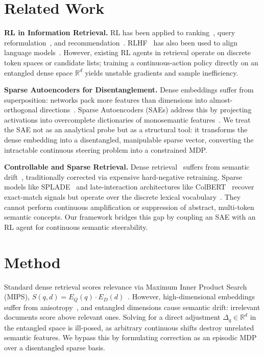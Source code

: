 \documentclass[sigconf]{acmart}
\begin{document}
\section{Related Work}

\textbf{RL in Information Retrieval.}
RL has been applied to ranking~\cite{hofmann2013}, query reformulation~\cite{nogueira2017, buck2018}, and recommendation~\cite{afsar2022}. RLHF~\cite{christiano2017} has also been used to align language models~\cite{ouyang2022, stiennon2020}. However, existing RL agents in retrieval operate on discrete token spaces or candidate lists; training a continuous-action policy directly on an entangled dense space $\mathbb{R}^d$ yields unstable gradients and sample inefficiency.

\textbf{Sparse Autoencoders for Disentanglement.}
Dense embeddings suffer from superposition: networks pack more features than dimensions into almost-orthogonal directions~\cite{elhage2022}. Sparse Autoencoders (SAEs) address this by projecting activations into overcomplete dictionaries of monosemantic features~\cite{cunningham2024, bricken2023, templeton2024}. We treat the SAE not as an analytical probe but as a structural tool: it transforms the dense embedding into a disentangled, manipulable sparse vector, converting the intractable continuous steering problem into a constrained MDP.

\textbf{Controllable and Sparse Retrieval.}
Dense retrieval~\cite{karpukhin2020, izacard2022} suffers from semantic drift~\cite{zhan2021}, traditionally corrected via expensive hard-negative retraining. Sparse models like SPLADE~\cite{formal2021splade} and late-interaction architectures like ColBERT~\cite{khattab2020} recover exact-match signals but operate over the discrete lexical vocabulary~\cite{robertson1994}. They cannot perform continuous amplification or suppression of abstract, multi-token semantic concepts. Our framework bridges this gap by coupling an SAE with an RL agent for continuous semantic steerability.

\section{Method}

Standard dense retrieval scores relevance via Maximum Inner Product Search (MIPS), $S(q,d) = E_Q(q) \cdot E_D(d)$~\cite{johnson2019}. However, high-dimensional embeddings suffer from anisotropy~\cite{ethayarajh2019}, and entangled dimensions cause semantic drift: irrelevant documents score above relevant ones. Solving for a direct adjustment $\Delta_q \in \mathbb{R}^d$ in the entangled space is ill-posed, as arbitrary continuous shifts destroy unrelated semantic features. We bypass this by formulating correction as an episodic MDP~\cite{sutton2018} over a disentangled sparse basis.
\end{document}
